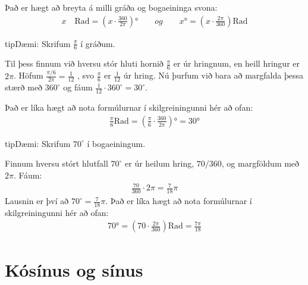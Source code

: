 \documentclass[a4paper,10pt,icelandic]{sphinxmanual}
\begin{document}
Það er hægt að breyta á milli gráða og bogaeininga svona:
\begin{equation*}
\begin{split}x \quad \text{Rad} = \left(x \cdot \frac{360}{2 \pi}\right)° \qquad og \qquad  x°=\left( x \cdot \frac{2 \pi}{360}\right) \text{Rad}\end{split}
\end{equation*}
\begin{sphinxadmonition}{tip}{Dæmi:}
Skrifum \(\frac{\pi}{6}\) í gráðum.


Til þess finnum við hversu stór hluti hornið \(\frac{\pi}{6}\) er úr hringnum, en heill hringur er \(2 \pi\).
Höfum \(\frac{\pi/6}{2 \pi}=\frac{1}{12}\) , svo \(\frac{\pi}{6}\) er \(\frac{1}{12}\) úr hring.
Nú þurfum við bara að margfalda þessa stærð með \(360^{\circ}\) og fáum \(\frac{1}{12}\cdot 360^{\circ} = 30^{\circ}\).

Það er líka hægt að nota formúlurnar í skilgreiningunni hér að ofan:
\begin{equation*}
\begin{split}\frac{\pi}{6} \text{Rad} = \left(\frac{\pi}{6} \cdot \frac{360}{2 \pi}\right)° = 30°\end{split}
\end{equation*}\end{sphinxadmonition}

\begin{sphinxadmonition}{tip}{Dæmi:}
Skrifum \(70^{\circ}\) í bogaeiningum.


Finnum hversu stórt hlutfall \(70^{\circ}\) er úr heilum hring, \(70/360\), og margföldum með \(2 \pi\). Fáum:
\begin{equation*}
\begin{split}\frac{70}{360} \cdot 2 \pi=\frac{7}{18} \pi\end{split}
\end{equation*}
Lausnin er því að \(70^{\circ}=\frac{7}{18}\pi\). Það er líka hægt að nota formúlurnar í skilgreiningunni hér að ofan:
\begin{equation*}
\begin{split}70°=\left( 70 \cdot \frac{2 \pi}{360}\right) \text{Rad} = \frac{7\pi}{18}\end{split}
\end{equation*}\end{sphinxadmonition}


\section{Kósínus og sínus}
\label{\detokenize{Kafli07:kosinus-og-sinus}}
\end{document}

